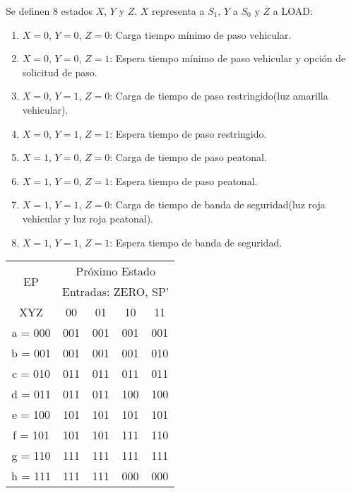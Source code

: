 Se definen 8 estados $X$, $Y$ y $Z$. $X$ representa a $S_1$, $Y$ a $S_0$ y
$\overline{Z}$ a LOAD:
\begin{enumerate}[label*=\textbf{\alph*)}]
  \item $X=0$, $Y=0$, $Z=0$: Carga tiempo mínimo de paso vehicular.
  \item $X=0$, $Y=0$, $Z=1$: Espera tiempo mínimo de paso vehicular y opción de solicitud de paso.
  \item $X=0$, $Y=1$, $Z=0$: Carga de tiempo de paso restringido(luz amarilla vehicular).
  \item $X=0$, $Y=1$, $Z=1$: Espera tiempo de paso restringido.
  \item $X=1$, $Y=0$, $Z=0$: Carga de tiempo de paso peatonal.
  \item $X=1$, $Y=0$, $Z=1$: Espera tiempo de paso peatonal.
  \item $X=1$, $Y=1$, $Z=0$: Carga de tiempo de banda de seguridad(luz roja vehicular y luz roja peatonal).
  \item $X=1$, $Y=1$, $Z=1$: Espera tiempo de banda de seguridad.
\end{enumerate}


\begin{table}[H]
  \centering
  \begin{tabular}{c c c c c}
    \toprule
    \multirow{2}{*}{EP}  & \multicolumn{4}{c}{Próximo Estado} \\
    & \multicolumn{4}{c}{Entradas: ZERO, SP'} \\  \cmidrule{2-5}
    XYZ & 00 & 01 & 10 & 11\\ \toprule
    a = 000 & 001 & 001 & 001 & 001\\ \midrule
    b = 001 & 001 & 001 & 001 & 010\\ \midrule
    c = 010 & 011 & 011 & 011 & 011\\ \midrule
    d = 011 & 011 & 011 & 100 & 100\\ \midrule
    e = 100 & 101 & 101 & 101 & 101\\ \midrule
    f = 101 & 101 & 101 & 111 & 110\\ \midrule
    g = 110 & 111 & 111 & 111 & 111\\ \midrule
    h = 111 & 111 & 111 & 000 & 000\\ \bottomrule
  \end{tabular}
\end{table}

